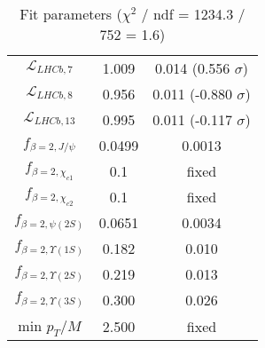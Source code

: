 \begin{table}[h!]
\begin{tabular}{c|c|c}
$\mathcal L_{LHCb,7}$ & 1.009 & 0.014 (0.556 $\sigma$) \\
$\mathcal L_{LHCb,8}$ & 0.956 & 0.011 (-0.880 $\sigma$) \\
$\mathcal L_{LHCb,13}$ & 0.995 & 0.011 (-0.117 $\sigma$) \\
$f_{\beta=2,J/\psi}$ & 0.0499 & 0.0013 \\
$f_{\beta=2,\chi_{c1}}$ & 0.1 & fixed \\
$f_{\beta=2,\chi_{c2}}$ & 0.1 & fixed \\
$f_{\beta=2,\psi(2S)}$ & 0.0651 & 0.0034 \\
$f_{\beta=2,\Upsilon(1S)}$ & 0.182 & 0.010 \\
$f_{\beta=2,\Upsilon(2S)}$ & 0.219 & 0.013 \\
$f_{\beta=2,\Upsilon(3S)}$ & 0.300 & 0.026 \\
min $p_T/M$ & 2.500 & fixed \\
\end{tabular}
\caption{Fit parameters ($\chi^2$ / ndf = 1234.3 / 752 = 1.6)}
\end{table}
